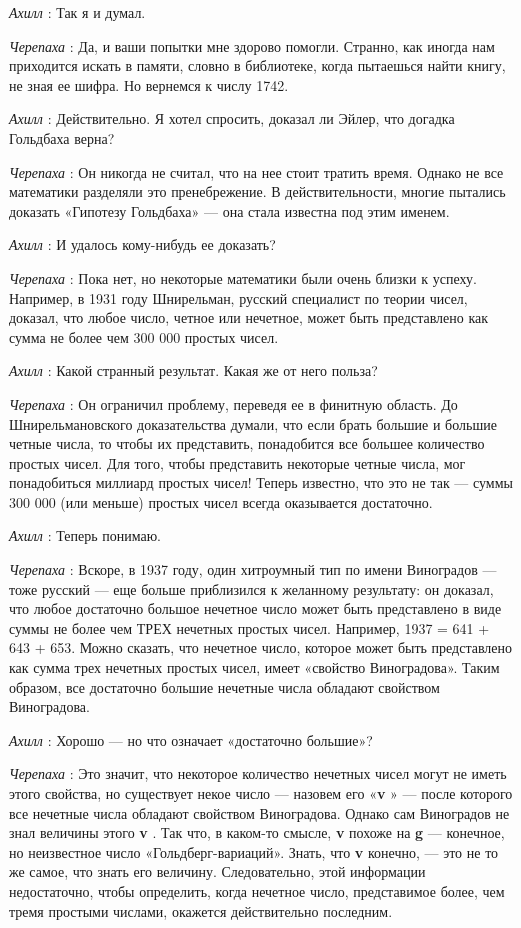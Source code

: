 \documentclass[../main.tex]{subfiles}
\begin{document}
\begin{dialogue}
\emph{Ахилл} : Так я и думал.

\emph{Черепаха} : Да, и ваши попытки мне здорово помогли. Странно, как иногда нам приходится искать в памяти, словно в библиотеке, когда пытаешься найти книгу, не зная ее шифра. Но вернемся к числу 1742.

\emph{Ахилл} : Действительно. Я хотел спросить, доказал ли Эйлер, что догадка Гольдбаха верна?

\emph{Черепаха} : Он никогда не считал, что на нее стоит тратить время. Однако не все математики разделяли это пренебрежение. В действительности, многие пытались доказать «Гипотезу Гольдбаха» --- она стала известна под этим именем.

\emph{Ахилл} : И удалось кому-нибудь ее доказать?

\emph{Черепаха} : Пока нет, но некоторые математики были очень близки к успеху. Например, в 1931 году Шнирельман, русский специалист по теории чисел, доказал, что любое число, четное или нечетное, может быть представлено как сумма не более чем 300 000 простых чисел.

\emph{Ахилл} : Какой странный результат. Какая же от него польза?

\emph{Черепаха} : Он ограничил проблему, переведя ее в финитную область. До Шнирельмановского доказательства думали, что если брать большие и большие четные числа, то чтобы их представить, понадобится все большее количество простых чисел. Для того, чтобы представить некоторые четные числа, мог понадобиться миллиард простых чисел! Теперь известно, что это не так --- суммы 300 000 (или меньше) простых чисел всегда оказывается достаточно.

\emph{Ахилл} : Теперь понимаю.

\emph{Черепаха} : Вскоре, в 1937 году, один хитроумный тип по имени Виноградов --- тоже русский --- еще больше приблизился к желанному результату: он доказал, что любое достаточно большое нечетное число может быть представлено в виде суммы не более чем ТРЕХ нечетных простых чисел. Например, 1937 = 641 + 643 + 653. Можно сказать, что нечетное число, которое может быть представлено как сумма трех нечетных простых чисел, имеет «свойство Виноградова». Таким образом, все достаточно большие нечетные числа обладают свойством Виноградова.

\emph{Ахилл} : Хорошо --- но что означает «достаточно большие»?

\emph{Черепаха} : Это значит, что некоторое количество нечетных чисел могут не иметь этого свойства, но существует некое число --- назовем его «\textbf{v} » --- после которого все нечетные числа обладают свойством Виноградова. Однако сам Виноградов не знал величины этого \textbf{v} . Так что, в каком-то смысле, \textbf{v} похоже на \textbf{g} --- конечное, но неизвестное число «Гольдберг-вариаций». Знать, что \textbf{v} конечно, --- это не то же самое, что знать его величину. Следовательно, этой информации недостаточно, чтобы определить, когда нечетное число, представимое более, чем тремя простыми числами, окажется действительно последним.


\end{dialogue}
\end{document}
